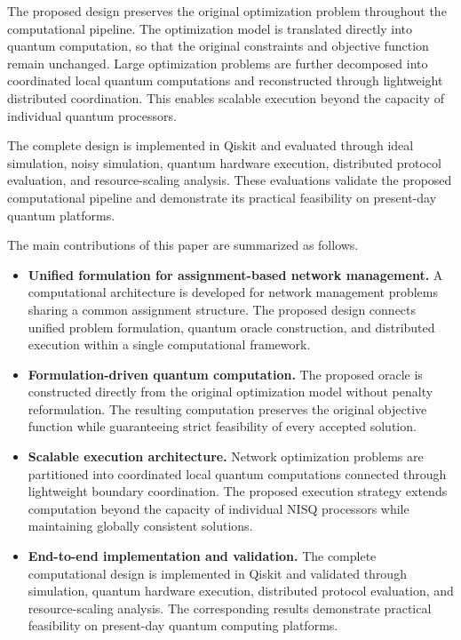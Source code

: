 \documentclass[journal]{IEEEtran}
\begin{document}
{The proposed design preserves the original optimization problem throughout the computational pipeline. The optimization model is translated directly into quantum computation, so that the original constraints and objective function remain unchanged. Large optimization problems are further decomposed into coordinated local quantum computations and reconstructed through lightweight distributed coordination. This enables scalable execution beyond the capacity of individual quantum processors.

The complete design is implemented in Qiskit and evaluated through ideal simulation, noisy simulation, quantum hardware execution, distributed protocol evaluation, and resource-scaling analysis. These evaluations validate the proposed computational pipeline and demonstrate its practical feasibility on present-day quantum platforms.

The main contributions of this paper are summarized as follows.

\begin{itemize}
\item \textbf{Unified formulation for assignment-based network management.}
A computational architecture is developed for network management problems sharing a common assignment structure. The proposed design connects unified problem formulation, quantum oracle construction, and distributed execution within a single computational framework.

\item \textbf{Formulation-driven quantum computation.}
The proposed oracle is constructed directly from the original optimization model without penalty reformulation. The resulting computation preserves the original objective function while guaranteeing strict feasibility of every accepted solution.

\item \textbf{Scalable execution architecture.}
Network optimization problems are partitioned into coordinated local quantum computations connected through lightweight boundary coordination. The proposed execution strategy extends computation beyond the capacity of individual NISQ processors while maintaining globally consistent solutions.

\item \textbf{End-to-end implementation and validation.}
The complete computational design is implemented in Qiskit and validated through simulation, quantum hardware execution, distributed protocol evaluation, and resource-scaling analysis. The corresponding results demonstrate practical feasibility on present-day quantum computing platforms.
\end{itemize}

}
\end{document}

